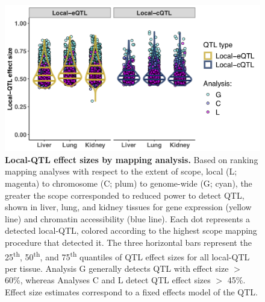 \documentclass[10pt,letterpaper,twoside]{article}
\begin{document}
\begin{figure}[hp]
\renewcommand{\familydefault}{\sfdefault}\normalfont
\centering
\includegraphics[width=\textwidth, trim={0in 0in 0in 0in}, clip]{figs/local_qtl_effects.png}
\caption{\textbf{Local-QTL effect sizes by mapping analysis.} Based on ranking mapping analyses with respect to the extent of scope, local (L; magenta) to chromosome (C; plum) to genome-wide (G; cyan), the greater the scope corresponded to reduced power to detect QTL, shown in liver, lung, and kidney tissues for gene expression (yellow line) and chromatin accessibility (blue line). Each dot represents a detected local-QTL, colored according to the highest scope mapping procedure that detected it. The three horizontal bars represent the 25\textsuperscript{th}, 50\textsuperscript{th}, and 75\textsuperscript{th} quantiles of QTL effect sizes for all local-QTL per tissue. Analysis G generally detects QTL with effect size $>$ 60\%, whereas Analyses C and L detect QTL effect sizes $>$ 45\%. Effect size estimates correspond to a fixed effects model of the QTL.
\label{fig:qtl_effect_sizes_by_method}}
\end{figure}

\clearpage
\end{document}
